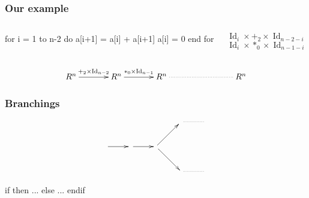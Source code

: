 \documentclass[10pt,handout]{beamer}
\DeclareMathOperator{\Id}{Id}
\begin{document}
\begin{frame}[fragile]
  \frametitle{Our example}

  \Large

  \begin{columns}

    \begin{column}{0.6\textwidth}
      \begin{center}
        \begin{minipage}{\textwidth}
\begin{semiverbatim}
  \alert<2>{for i = 1 to n-2 do}
    a[i+1] = a[i] + a[i+1]
    a[i] = 0
  end for
\end{semiverbatim}
        \end{minipage}
      \end{center}
    \end{column}

    \begin{column}{0.4\textwidth}
      \begin{minipage}{\textwidth}
        \begin{flushright}
          $\phantom{ }$\\
          $\Id_{i}\times +_2 \times\Id_{n-2-i}$\\
          $\Id_i\times *_0 \times\Id_{n-1-i}$\\
        \end{flushright}
      \end{minipage}
    \end{column}
  \end{columns}

  \vfill

  \begin{center}
    \[\xymatrix@C=3.5em{
      R^n\ar[r]^{+_2\times{\Id_{n-2}}} & R^n\ar[r]^{*_0\times{\Id_{n-1}}} &
      R^{n} \ar@{.}[rr] && R^n
    }\]
  \end{center}
\end{frame}


\begin{frame}[fragile]
  \frametitle{Branchings}

  \Large

  \begin{center}
    \[\xymatrix{
             &        &                 & \ar@{.}[r] & \\
      \ar[r] & \ar[r] & \ar[ru] \ar[rd] \\
             &        &                 & \ar@{.}[r] & 
    }\]
  \end{center}

  \begin{center}
    \begin{minipage}{0.7\textwidth}
\begin{semiverbatim}
  \alert<2>{if  then}
    ...
  else
    ...
  endif
\end{semiverbatim}
    \end{minipage}
  \end{center}
  
\end{frame}
\end{document}
